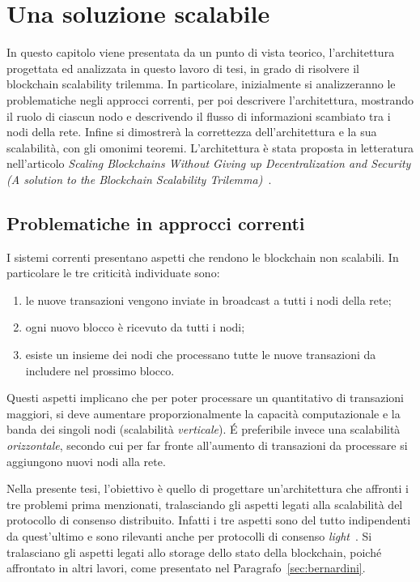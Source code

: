 \chapter{Una soluzione scalabile}

In questo capitolo viene presentata da un punto di vista teorico, l'architettura progettata ed analizzata in questo lavoro di tesi, in grado di risolvere il blockchain scalability trilemma. In particolare, inizialmente si analizzeranno le problematiche negli approcci correnti, per poi descrivere l'architettura, mostrando il ruolo di ciascun nodo e descrivendo il flusso di informazioni scambiato tra i nodi della rete. Infine si dimostrerà la correttezza dell'architettura e la sua scalabilità, con gli omonimi teoremi.
L'architettura è stata proposta in letteratura nell'articolo \emph{Scaling Blockchains Without Giving up Decentralization and Security (A solution to the Blockchain Scalability Trilemma)}~\cite{del2020scaling}.

\section{Problematiche in approcci correnti}

I sistemi correnti presentano aspetti che rendono le blockchain non scalabili. In particolare le tre criticità individuate sono:

\begin{enumerate}
	\item le nuove transazioni vengono inviate in broadcast a tutti i nodi della rete;
	\item ogni nuovo blocco è ricevuto da tutti i nodi;
	\item esiste un insieme dei nodi che processano tutte le nuove transazioni da includere nel prossimo blocco.
\end{enumerate}

Questi aspetti implicano che per poter processare un quantitativo di transazioni maggiori, si deve aumentare proporzionalmente la capacità computazionale e la banda dei singoli nodi (scalabilità \emph{verticale}). \'E preferibile invece una scalabilità \emph{orizzontale}, secondo cui per far fronte all'aumento di transazioni da processare si aggiungono nuovi nodi alla rete.

Nella presente tesi, l'obiettivo è quello di progettare un'architettura che affronti i tre problemi prima menzionati, tralasciando gli aspetti legati alla scalabilità del protocollo di consenso distribuito. Infatti i tre aspetti sono del tutto indipendenti da quest'ultimo e sono rilevanti anche per protocolli di consenso \emph{light}~\cite{poon2016bitcoin}. Si tralasciano gli aspetti legati allo storage dello stato della blockchain, poiché affrontato in altri lavori, come presentato nel Paragrafo~\ref{sec:bernardini}.

